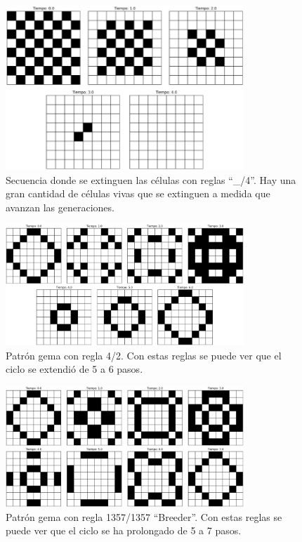 \documentclass[12pt]{article}
\begin{document}
\begin{figure}
  \centering
  \includegraphics[width=0.8\textwidth]{imagenes/sparks2.png}
  \caption{Secuencia donde se extinguen las células con reglas ``\_/4''. Hay una gran cantidad de células vivas que se extinguen a medida que avanzan las generaciones.\label{img:sparks2}}
\end{figure}

\begin{figure}
  \centering
  \includegraphics[width=0.8\textwidth]{imagenes/gema4-2.png}
  \caption{Patrón gema con regla 4/2. Con estas reglas se puede ver que el ciclo se extendió de 5 a 6 pasos.\label{img:gema4-2}}
\end{figure}

\begin{figure}
  \centering
  \includegraphics[width=0.8\textwidth]{imagenes/gema1357-1357.png}
  \caption{Patrón gema con regla 1357/1357 ``Breeder''. Con estas reglas se puede ver que el ciclo se ha prolongado de 5 a 7 pasos.\label{img:gema1357-1357}}
\end{figure}
\end{document}
